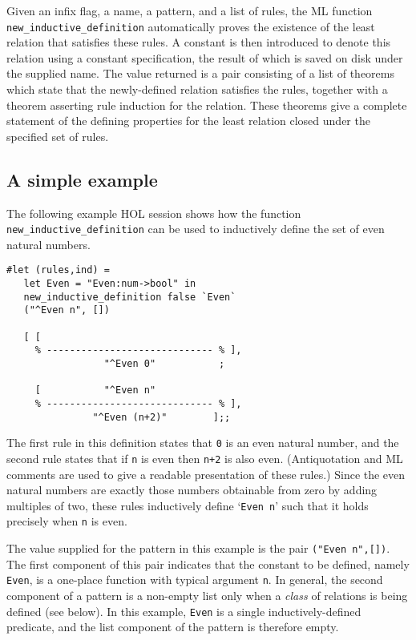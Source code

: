 \documentclass[twocolumn,fleqn,layout]{article}
\begin{document}
Given an infix flag, a name, a pattern, and a list of rules, the {\small ML}
function \verb!new_inductive_definition! automatically proves the existence of
the least relation that satisfies these rules.  A constant is then introduced
to denote this relation using a constant specification, the result of which is
saved on disk under the supplied name. The value returned is a pair consisting
of a list of theorems which state that the newly-defined relation satisfies the
rules, together with a \mbox{theorem} asserting rule induction for the
relation.  These theorems give a complete statement of the defining properties
for the least relation closed under the specified set of rules.

\subsection{A simple example}

The following example {\small HOL} session shows how the function
\verb!new_inductive_definition! can be used to inductively define the set of
even natural numbers.

\begin{session}\begin{verbatim}
#let (rules,ind) =
   let Even = "Even:num->bool" in
   new_inductive_definition false `Even`
   ("^Even n", [])

   [ [
     % ----------------------------- % ],
                 "^Even 0"           ;

     [           "^Even n"
     % ----------------------------- % ],
               "^Even (n+2)"        ];;
\end{verbatim}\end{session}


\noindent The first rule in this definition states that \verb!0! is an even
natural number, and the second rule states that if \verb!n! is even then
\verb!n+2! is also even.  (Antiquotation and {\small ML} comments are used to
give a readable presentation of these rules.)  Since the even natural numbers
are \mbox{exactly} those numbers obtainable from zero by adding multiples of
two, these rules inductively define `\verb!Even n!' such that it holds
\mbox{precisely} when \verb!n! is even.

The value supplied for the pattern in this example is the pair
\verb!("Even n",[])!.  The first component of this pair indicates that
the constant to be defined, namely \verb!Even!, is a one-place
function with typical argument \verb!n!.  In general, the second
component of a pattern is a non-empty list only when a {\it class\/}
of relations is being defined (see below).  In this example,
{\verb!Even!} is a single inductively-defined predicate, and the list
component of the pattern is therefore empty.
\end{document}

